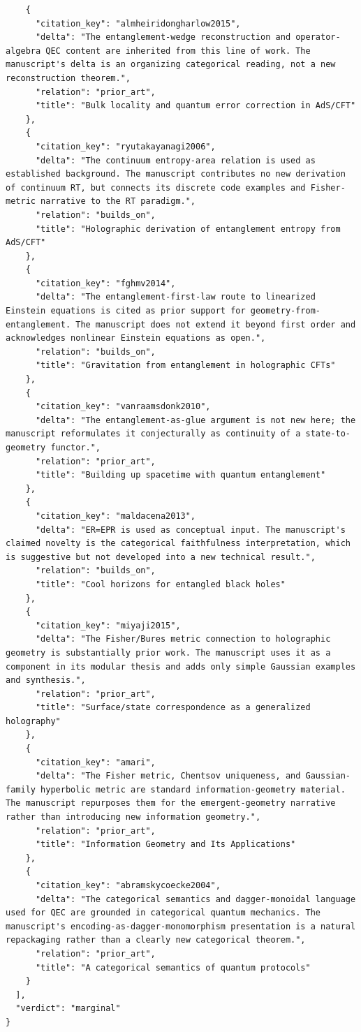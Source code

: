\documentclass[11pt]{article}
\begin{document}
\begin{verbatim}
    {
      "citation_key": "almheiridongharlow2015",
      "delta": "The entanglement-wedge reconstruction and operator-algebra QEC content are inherited from this line of work. The manuscript's delta is an organizing categorical reading, not a new reconstruction theorem.",
      "relation": "prior_art",
      "title": "Bulk locality and quantum error correction in AdS/CFT"
    },
    {
      "citation_key": "ryutakayanagi2006",
      "delta": "The continuum entropy-area relation is used as established background. The manuscript contributes no new derivation of continuum RT, but connects its discrete code examples and Fisher-metric narrative to the RT paradigm.",
      "relation": "builds_on",
      "title": "Holographic derivation of entanglement entropy from AdS/CFT"
    },
    {
      "citation_key": "fghmv2014",
      "delta": "The entanglement-first-law route to linearized Einstein equations is cited as prior support for geometry-from-entanglement. The manuscript does not extend it beyond first order and acknowledges nonlinear Einstein equations as open.",
      "relation": "builds_on",
      "title": "Gravitation from entanglement in holographic CFTs"
    },
    {
      "citation_key": "vanraamsdonk2010",
      "delta": "The entanglement-as-glue argument is not new here; the manuscript reformulates it conjecturally as continuity of a state-to-geometry functor.",
      "relation": "prior_art",
      "title": "Building up spacetime with quantum entanglement"
    },
    {
      "citation_key": "maldacena2013",
      "delta": "ER=EPR is used as conceptual input. The manuscript's claimed novelty is the categorical faithfulness interpretation, which is suggestive but not developed into a new technical result.",
      "relation": "builds_on",
      "title": "Cool horizons for entangled black holes"
    },
    {
      "citation_key": "miyaji2015",
      "delta": "The Fisher/Bures metric connection to holographic geometry is substantially prior work. The manuscript uses it as a component in its modular thesis and adds only simple Gaussian examples and synthesis.",
      "relation": "prior_art",
      "title": "Surface/state correspondence as a generalized holography"
    },
    {
      "citation_key": "amari",
      "delta": "The Fisher metric, Chentsov uniqueness, and Gaussian-family hyperbolic metric are standard information-geometry material. The manuscript repurposes them for the emergent-geometry narrative rather than introducing new information geometry.",
      "relation": "prior_art",
      "title": "Information Geometry and Its Applications"
    },
    {
      "citation_key": "abramskycoecke2004",
      "delta": "The categorical semantics and dagger-monoidal language used for QEC are grounded in categorical quantum mechanics. The manuscript's encoding-as-dagger-monomorphism presentation is a natural repackaging rather than a clearly new categorical theorem.",
      "relation": "prior_art",
      "title": "A categorical semantics of quantum protocols"
    }
  ],
  "verdict": "marginal"
}
\end{verbatim}
\end{document}
